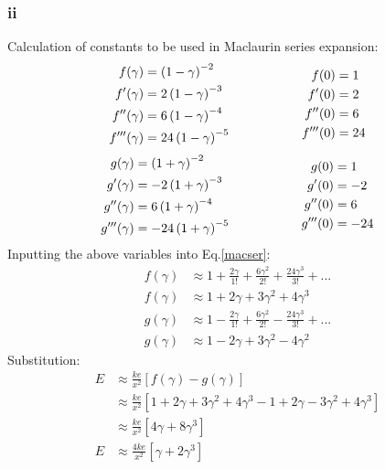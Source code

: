 \documentclass[11pt]{article}
\numberwithin{equation}{section}
\begin{document}
\subsubsection*{ii}
Calculation of constants to be used in Maclaurin series expansion:
\begin{equation*}
	\begin{aligned}[c]
		f(\gamma) &= \left( 1 - \gamma \right)^{-2}\\
		f'(\gamma) &= 2\left(1-\gamma\right)^{-3}\\
		f''(\gamma) &= 6\left(1-\gamma\right)^{-4}\\
		f'''(\gamma) &= 24\left(1-\gamma\right)^{-5}
	\end{aligned}
	\makebox[2cm]{}
	\begin{aligned}[c]
		f(0) &= 1\\
		f'(0) &= 2\\
		f''(0) &= 6\\
		f'''(0) &= 24\\
	\end{aligned}
\end{equation*}
\begin{equation*}
	\begin{aligned}[c]
		g(\gamma) &= \left( 1 + \gamma \right)^{-2}\\
		g'(\gamma) &= -2\left(1+\gamma\right)^{-3}\\
		g''(\gamma) &= 6\left(1+\gamma\right)^{-4}\\
		g'''(\gamma) &= -24\left(1+\gamma\right)^{-5}
	\end{aligned}
	\makebox[2cm]{}
	\begin{aligned}[c]
		g(0) &= 1\\
		g'(0) &= -2\\
		g''(0) &= 6\\
		g'''(0) &= -24\\
	\end{aligned}
\end{equation*}
Inputting the above variables into Eq.\ref{macser}:
\begin{align}
	f(\gamma) &\approx 1 + \frac{2 \gamma}{1!} + \frac{6\gamma^2}{2!} + \frac{24\gamma^3}{3!} + ...\\
	f(\gamma) &\approx 1 + 2\gamma+ 3\gamma^2 + 4\gamma^3 \\ 
	g(\gamma) &\approx 1 - \frac{2 \gamma}{1!} + \frac{6\gamma^2}{2!} - \frac{24\gamma^3}{3!} + ...\\
	g(\gamma) &\approx 1 - 2\gamma + 3\gamma^2 - 4\gamma^2
\end{align}
Substitution:
\begin{align}
	E &\approx \frac{ke}{x^2} \left[ f(\gamma) - g(\gamma)\right]\\
	&\approx \frac{ke}{x^2} \left[ 1 + 2\gamma + 3\gamma^2 + 4\gamma^3 - 1 + 2\gamma - 3\gamma^2 + 4\gamma^3 \right]\\
	&\approx \frac{ke}{x^2}\left[ 4\gamma + 8\gamma^3 \right]\\
	E &\approx \frac{4ke}{x^2}\left[ \gamma + 2\gamma^3 \right]
\end{align}
\end{document}
